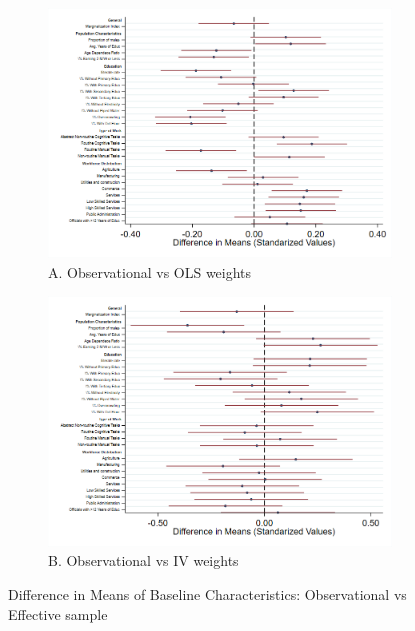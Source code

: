 \documentclass[dv_diss_main.tex]{subfiles}
\begin{document}
\begin{figure}[H] 
		\centering 
		
		\begin{subfigure}[t]{0.6\textwidth} 
			\centering
			\includegraphics[width=\linewidth]{figures/obs_res_ols_sc_tr.png}
			\caption*{\footnotesize A. Observational vs OLS weights} 
		\end{subfigure} 
	\vspace{0.1cm} %
		\begin{subfigure}[t]{0.6\textwidth} 
			\centering
			\includegraphics[width=\linewidth]{figures/obs_res_cf_sc_tr.png}
			\caption*{\footnotesize B. Observational vs IV weights} 
		\end{subfigure}
		\caption{Difference in Means of Baseline Characteristics: Observational vs Effective sample}\label{fig:late}
		\parbox{\textwidth}{\small 
			\vspace{2eX}
			\footnotesize	
			\sammi
		}
\end{figure}
\end{document}
